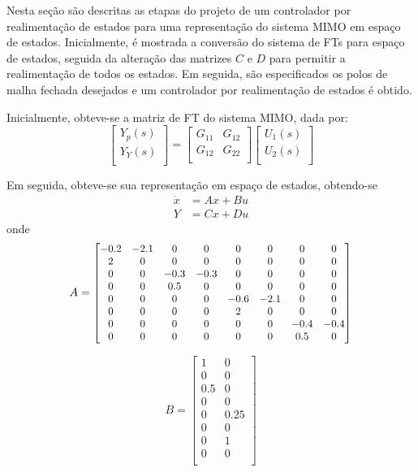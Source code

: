 
Nesta seção são descritas as etapas do projeto de um controlador por realimentação de estados para uma representação do sistema MIMO em espaço de estados. Inicialmente, é mostrada a conversão do sistema de FTs para espaço de estados, seguida da alteração das matrizes $C$ e $D$ para permitir a realimentação de todos os estados. Em seguida, são especificados os polos de malha fechada desejados e um controlador por realimentação de estados é obtido.

Inicialmente, obteve-se a matriz de FT do sistema MIMO, dada por:
$$ \begin{bmatrix}
        Y_{p}(s)\\
        Y_{Y}(s)\\
        \end{bmatrix} = \begin{bmatrix}
        G_{11} & G_{12}\\
        G_{12} & G_{22}\\
        \end{bmatrix}
        \begin{bmatrix}
        U_{1}(s)\\
        U_{2}(s)\\
        \end{bmatrix} $$

Em seguida, obteve-se sua representação em espaço de estados, obtendo-se
\begin{align*}
    \dot{x} &= A x + B u \\
    Y &= C x + D u
\end{align*}
\noindent onde
$$ A = \scalemath{0.92}{\begin{bmatrix}
        -0.2 & -2.1 & 0 & 0 & 0 & 0 & 0 & 0\\
        2 & 0 & 0 & 0 & 0 & 0 & 0 & 0 \\
        0 & 0 & -0.3 & -0.3 & 0 & 0 & 0 & 0 \\
        0 & 0 & 0.5 & 0 & 0 & 0 & 0 & 0 \\
        0 & 0 & 0 & 0 & -0.6 & -2.1 & 0 & 0 \\
        0 & 0 & 0 & 0 & 2 & 0 & 0 & 0 \\
        0 & 0 & 0 & 0 & 0 & 0 & -0.4 & -0.4 \\
        0 & 0 & 0 & 0 & 0 & 0 & 0.5 & 0 \\
        \end{bmatrix} }$$
        
$$ B = \begin{bmatrix}
        1 & 0 \\
        0 & 0 \\
        0.5 & 0 \\
        0 & 0 \\
        0 & 0.25 \\
        0 & 0 \\
        0 & 1 \\
        0 & 0 \\
        \end{bmatrix} $$

